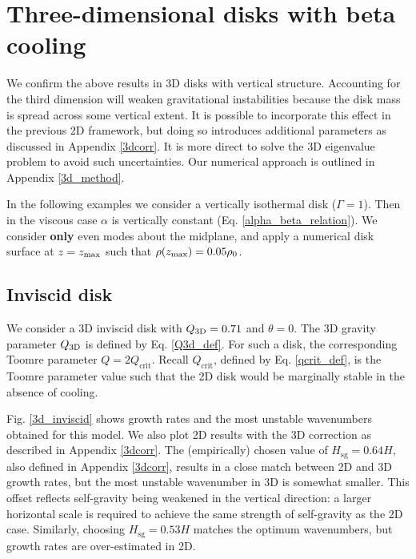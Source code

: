 \section{Three-dimensional disks with beta cooling}\label{3ddisk}
We confirm the above results in 3D disks with vertical
structure. Accounting for the third dimension will weaken gravitational instabilities
because the disk mass is spread across some vertical extent. It is
possible to incorporate this effect in the previous 2D framework, but doing so
introduces additional parameters as discussed in Appendix
\ref{3dcorr}. It is more direct to solve the 3D eigenvalue problem to
avoid such uncertainties. Our numerical approach is outlined in Appendix
\ref{3d_method}. 


In the following examples we consider a vertically isothermal disk
($\Gamma=1$). Then in the viscous case $\alpha$ is vertically
constant (Eq. \ref{alpha_beta_relation}). We consider {\bf only} even modes about
the midplane, and apply a numerical disk surface at $z=z_\mathrm{max}$ such
that $\rho(z_\mathrm{max})=0.05\rho_0$.    

\subsection{Inviscid disk}

We consider a 3D inviscid disk with $Q_\mathrm{3D}=0.71$ and $\theta=0$. 
The 3D gravity parameter $Q_\mathrm{3D}$ is defined by 
Eq. \ref{Q3d_def}. For such a disk, the corresponding Toomre parameter 
$Q=2Q_\mathrm{crit}$. Recall $Q_\mathrm{crit}$, defined by
Eq. \ref{qcrit_def}, is the Toomre parameter value such that the 2D
disk would be marginally stable in the absence of cooling. 

Fig. \ref{3d_inviscid} shows growth rates and the most unstable
wavenumbers obtained for this model. We also plot 2D
results with the 3D correction as described in Appendix
\ref{3dcorr}. The (empirically) chosen value of
$H_\mathrm{sg}=0.64H$, also defined in Appendix \ref{3dcorr}, results in a close match between 2D and 3D
growth rates, but the most unstable wavenumber in 3D is somewhat smaller. 
This offset reflects self-gravity being weakened in the vertical 
direction: a larger horizontal scale is required to achieve the same
strength of self-gravity as the 2D case. Similarly, 
choosing $H_\mathrm{sg}=0.53H$ matches the optimum wavenumbers, but
growth rates are over-estimated in 2D.    

